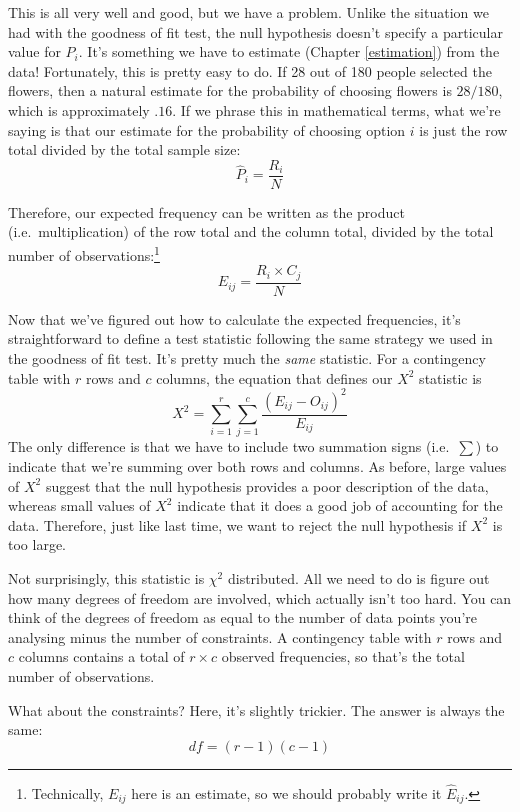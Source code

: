 \documentclass[
  11pt,
  a4paper,
  twoside,symmetric,openright]{book}
\theoremstyle{break}
\theoremstyle{break}
\begin{document}
This is all very well and good, but we have a problem. Unlike the situation we had with the goodness of fit test, the null hypothesis doesn't specify a particular value for \(P_i\). It's something we have to estimate (Chapter \ref{estimation}) from the data! Fortunately, this is pretty easy to do. If 28 out of 180 people selected the flowers, then a natural estimate for the probability of choosing flowers is \(28/180\), which is approximately \(.16\). If we phrase this in mathematical terms, what we're saying is that our estimate for the probability of choosing option \(i\) is just the row total divided by the total sample size:
\[
\hat{P}_i = \frac{R_i}{N}
\]

Therefore, our expected frequency can be written as the product (i.e.~multiplication) of the row total and the column total, divided by the total number of observations:\footnote{Technically, \(E_{ij}\) here is an estimate, so we should probably write it \(\hat{E}_{ij}\).}
\[
E_{ij} = \frac{R_i \times C_j}{N}
\]

Now that we've figured out how to calculate the expected frequencies, it's straightforward to define a test statistic following the same strategy we used in the goodness of fit test. It's pretty much the \emph{same} statistic. For a contingency table with \(r\) rows and \(c\) columns, the equation that defines our \(X^2\) statistic is
\[ 
X^2 = \sum_{i=1}^r \sum_{j=1}^c \frac{({E}_{ij} - O_{ij})^2}{{E}_{ij}}
\]
The only difference is that we have to include two summation signs (i.e.~\(\sum\)) to indicate that we're summing over both rows and columns. As before, large values of \(X^2\) suggest that the null hypothesis provides a poor description of the data, whereas small values of \(X^2\) indicate that it does a good job of accounting for the data. Therefore, just like last time, we want to reject the null hypothesis if \(X^2\) is too large.

Not surprisingly, this statistic is \(\chi^2\) distributed. All we need to do is figure out how many degrees of freedom are involved, which actually isn't too hard. You can think of the degrees of freedom as equal to the number of data points you're analysing minus the number of constraints. A contingency table with \(r\) rows and \(c\) columns contains a total of \(r \times c\) observed frequencies, so that's the total number of observations.

What about the constraints? Here, it's slightly trickier. The answer is always the same:
\[
df = (r-1)(c-1)
\]
\end{document}
